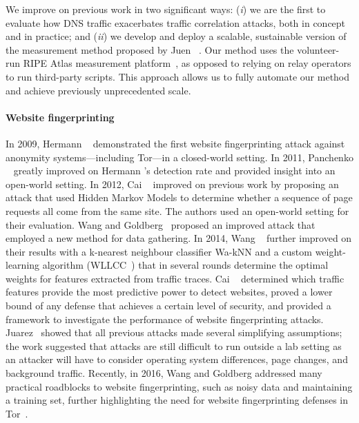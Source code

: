 We improve on previous work in two significant ways: (\emph{i}) we are
the first to evaluate how DNS traffic exacerbates traffic correlation
attacks, both in concept and in practice; and (\emph{ii}) we develop and
deploy a scalable, sustainable version of the measurement method proposed by Juen
\ea~\cite{Juen2015a}.  Our method uses the volunteer-run RIPE Atlas
measurement platform~\cite{atlas}, as opposed to relying on relay operators
to run third-party scripts.  This approach allows us to fully automate
our method and achieve previously unprecedented scale.

\paragraph{Website fingerprinting}
In 2009, Hermann \ea~\cite{Hermann2009a} demonstrated the first website
fingerprinting attack against anonymity systems---including Tor---in a
closed-world setting.  In 2011, Panchenko \ea~\cite{Panchenko2011a} greatly
improved on Hermann \ea's detection rate and provided insight into an open-world
setting.  In 2012, Cai \ea~\cite{Cai2012a} improved on previous work by
proposing an attack that used Hidden Markov Models to determine whether a sequence of
page requests all come from the same site.  The authors used an open-world
setting for their evaluation.  Wang and Goldberg~\cite{Wang2013a} proposed an
improved attack that employed a new method for data gathering.  In 2014, Wang
\ea~\cite{Wang2014a} further improved on their results with a
k-nearest neighbour classifier Wa-kNN and a custom weight-learning algorithm
(WLLCC~\cite{WangThesis}) that in several rounds determine the optimal weights
for features extracted from traffic traces.
Cai \ea~\cite{Cai2014b}
determined which traffic features provide the most predictive power to detect
websites, proved a lower bound of any defense that achieves a certain level of
security, and provided a framework to investigate the performance of
website fingerprinting attacks.
Juarez~\cite{Juarez2014a} showed that all previous attacks
made several simplifying
assumptions; the work suggested that attacks are still
difficult to run outside a lab setting as an attacker will have to consider
operating system differences, page changes, and background traffic.
Recently, in 2016, Wang and Goldberg addressed many practical
roadblocks to website fingerprinting, such as noisy data and maintaining a training set,
further highlighting the need for website fingerprinting defenses in
Tor~\cite{taoianreally}.


